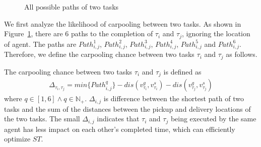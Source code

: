 \documentclass[sigconf,anonymous]{aamas}
\begin{document}
\begin{figure}[htbp]
  \centering
  \caption{All possible paths of two tasks}
  \label{fig:2TP}
\end{figure}

We first analyze the likelihood of carpooling between two tasks.
As shown in Figure~\ref{fig:2TP}, there are 6 paths to the completion of $\tau_{i}$ and $\tau_{j}$, 
ignoring the location of agent.
The paths are $Path^{1}_{i,j}$, $Path^{2}_{i,j}$, $Path^{3}_{i,j}$, $Path^{4}_{i,j}$, $Path^{5}_{i,j}$ and $Path^{6}_{i,j}$.
Therefore, we define the carpooling chance between two tasks $\tau_{i}$ and $\tau_{j}$ as follows.

\begin{definition}
\label{cp2}
    The carpooling chance between two tasks $\tau_{i}$ and $\tau_{j}$ is defined as 
    \begin{eqnarray}
    \label{eq:cp2}
        \Delta_{\tau_{i}, \tau_{j}} = min\{Path^{q}_{i,j}\} - 
        dis(v^{g}_{\tau_{i}}, v^{s}_{\tau_{i}}) - dis(v^{g}_{\tau_{j}}, v^{s}_{\tau_{j}})
    \end{eqnarray}
    where $q \in [1, 6] \wedge q \in \mathbb{N_+}$. $\Delta_{i,j}$ is difference 
    between the shortest path of two tasks 
    and the sum of the distances between the pickup and delivery locations of the two tasks.
    The small $\Delta_{i,j}$ indicates that $\tau_{i}$ and $\tau_{j}$ being executed by the same agent
    has less impact on each other's completed time, which can efficiently optimize ${ST}$.
\end{definition}


\end{document}
